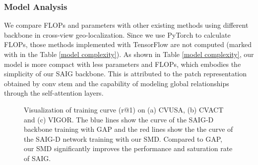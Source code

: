 \documentclass[sn-basic,iicol]{sn-jnl}
\theoremstyle{thmstyletwo}\newtheorem{example}{Example}\newtheorem{remark}{Remark}
\theoremstyle{thmstylethree}\newtheorem{definition}{Definition}
\begin{document}
\subsubsection{Model Analysis}

 We compare FLOPs and parameters with other existing methods using different backbone in cross-view geo-localization. Since we use PyTorch to calculate FLOPs, those methods implemented with TensorFlow are not computed (marked with  in the Table \ref{model complexity}). As shown in Table \ref{model complexity}, our model is more compact with less parameters and FLOPs, which embodies the simplicity of our SAIG backbone. This is attributed to the patch representation obtained by conv stem and the capability of modeling global relationships through the self-attention layers. 









\begin{figure*}[htbp] \begin{minipage}[t]{0.335\linewidth} \centering

\end{minipage}\begin{minipage}[t]{0.335\linewidth}
\centering
{}
\end{minipage}\begin{minipage}[t]{0.33\linewidth}
\centering
{}
\end{minipage}

\caption{Visualization of training curve (r@1) on (a) CVUSA, (b) CVACT and (c) VIGOR. The blue lines show the curve of the SAIG-D backbone training with GAP and the red lines show the the curve of the SAIG-D network training with our SMD. Compared to GAP, our SMD significantly improves the performance and saturation rate of SAIG.}
\label{pool}
\vspace{-10pt}
\end{figure*}
\end{document}
